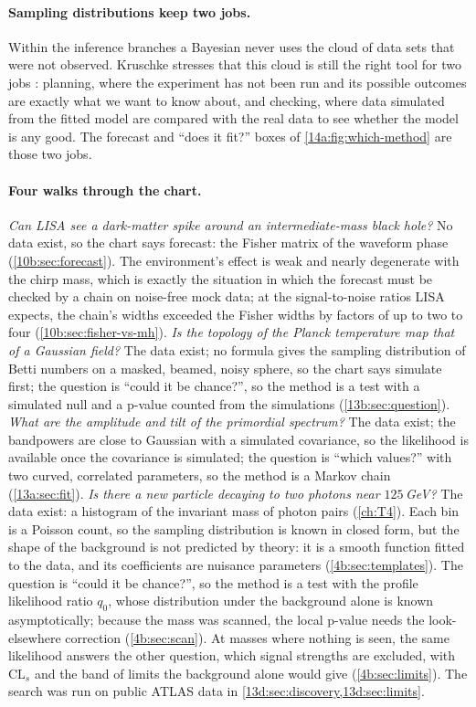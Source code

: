\paragraph{Sampling distributions keep two jobs.}
Within the inference branches a Bayesian never uses the cloud of data sets that were
not observed. Kruschke stresses that this cloud is still the right tool for two
jobs : planning, where the experiment has not been
run and its possible outcomes are exactly what we want to know about, and checking,
where data simulated from the fitted model are compared with the real data to see
whether the model is any good. The forecast and ``does it fit?'' boxes of
\cref{14a:fig:which-method} are those two jobs.

\paragraph{Four walks through the chart.}
\emph{Can LISA see a dark-matter spike around an intermediate-mass black hole?} No
data exist, so the chart says forecast: the Fisher matrix of the waveform phase
(\cref{10b:sec:forecast}). The environment's effect is weak and nearly degenerate with
the chirp mass, which is exactly the situation in which the forecast must be checked
by a chain on noise-free mock data; at the signal-to-noise ratios LISA expects, the
chain's widths exceeded the Fisher widths by factors of up to two to four
(\cref{10b:sec:fisher-vs-mh}).
\emph{Is the topology of the \textit{Planck} temperature map that of a Gaussian
field?} The data exist; no formula gives the sampling distribution of Betti numbers on a
masked, beamed, noisy sphere, so the chart says simulate first; the question is
``could it be chance?'', so the method is a test with a simulated null and a p-value
counted from the simulations (\cref{13b:sec:question}).
\emph{What are the amplitude and tilt of the primordial spectrum?} The data exist;
the bandpowers are close to Gaussian with a simulated covariance, so the likelihood is
available once the covariance is simulated; the question is ``which values?'' with
two curved, correlated parameters, so the method is a Markov chain
(\cref{13a:sec:fit}).
\emph{Is there a new particle decaying to two photons near $125\,$GeV?} The data exist:
a histogram of the invariant mass of photon pairs (\cref{ch:T4}). Each bin is a
Poisson count, so the sampling distribution is known in closed form, but the shape of
the background is not predicted by theory: it is a smooth function fitted to the data,
and its coefficients are nuisance parameters (\cref{4b:sec:templates}). The question is
``could it be chance?'', so the method is a test with the profile likelihood ratio
$q_0$, whose distribution under the background alone is known asymptotically; because
the mass was scanned, the local p-value needs the look-elsewhere correction
(\cref{4b:sec:scan}). At masses where nothing is seen, the same likelihood answers the
other question, which signal strengths are excluded, with $\mathrm{CL}_s$ and the band of
limits the background alone would give (\cref{4b:sec:limits}). The search was run on
public ATLAS data in \cref{13d:sec:discovery,13d:sec:limits}.

